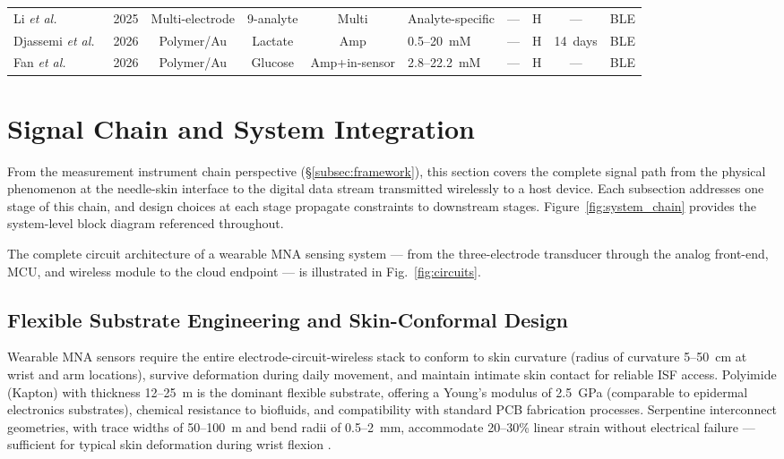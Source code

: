\documentclass[review,1p]{elsarticle}
\begin{document}
\begin{table}[htbp]
{\begin{tabular}{p{3.0cm}ccccp{2.2cm}p{1.6cm}ccc}
Li \textit{et al.}~\cite{Li2025Innovation}                & 2025 & Multi-electrode     & 9-analyte           & Multi      & Analyte-specific              & ---                             & H & ---      & BLE \\
Djassemi \textit{et al.}~\cite{Djassemi2026ACSsens}       & 2026 & Polymer/Au          & Lactate             & Amp        & 0.5--20~mM                    & ---                             & H & 14~days  & BLE \\
Fan \textit{et al.}~\cite{Fan2026EdgeAI}                  & 2026 & Polymer/Au          & Glucose             & Amp+in-sensor & 2.8--22.2~mM               & ---                             & H & ---      & BLE \\
\bottomrule
\end{tabular}%
}
\end{table}


\section{Signal Chain and System Integration}
\label{sec:circuits}

From the measurement instrument chain perspective (§\ref{subsec:framework}), this section covers the complete signal path from the physical phenomenon at the needle-skin interface to the digital data stream transmitted wirelessly to a host device. Each subsection addresses one stage of this chain, and design choices at each stage propagate constraints to downstream stages. Figure~\ref{fig:system_chain} provides the system-level block diagram referenced throughout.

The complete circuit architecture of a wearable MNA sensing system — from the three-electrode transducer through the analog front-end, MCU, and wireless module to the cloud endpoint — is illustrated in Fig.~\ref{fig:circuits}.

\subsection{Flexible Substrate Engineering and Skin-Conformal Design}
\label{subsec:flex_substrate}

Wearable MNA sensors require the entire electrode-circuit-wireless stack to conform to skin curvature (radius of curvature 5--50~cm at wrist and arm locations), survive deformation during daily movement, and maintain intimate skin contact for reliable ISF access. Polyimide (Kapton) with thickness 12--25~\textmu{}m is the dominant flexible substrate, offering a Young's modulus of 2.5~GPa (comparable to epidermal electronics substrates), chemical resistance to biofluids, and compatibility with standard PCB fabrication processes. Serpentine interconnect geometries, with trace widths of 50--100~\textmu{}m and bend radii of 0.5--2~mm, accommodate 20--30\% linear strain without electrical failure — sufficient for typical skin deformation during wrist flexion \cite{Son2022Stretchable}.
\end{document}

